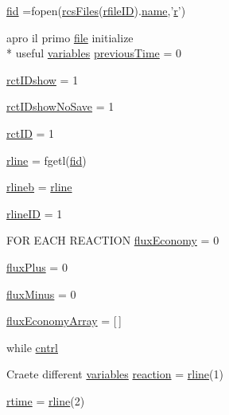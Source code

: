 \begin{DoxyCompactItemize}
\item 
\hyperlink{a00028_ae9011d40c6f13e68e6f07156e0da7c5d}{fid} =fopen(\hyperlink{a00028_aa7a414dad4901fc05688608a49adfd7e}{rcs\-Files}(\hyperlink{a00028_a2773ef160060ce8adead229154219112}{rfile\-I\-D}).\hyperlink{a00027_abbf559a76fab59203496b0847ab9502a}{name},'\hyperlink{a00031_ac862e7284527eb913b1351c8bfb8e079}{r}')
\item 
apro il primo \hyperlink{a00068_a4e8353d6c62cf54bf4a1a8f63e56b8c3}{file} initialize \\*
useful \hyperlink{a00037_a075795b83d470ba58980e465541f16e9}{variables} \hyperlink{a00028_a17b8652a085b5add031a40fb1c9a680e}{previous\-Time} = 0
\item 
\hyperlink{a00028_acfa9ac92c0e448faa531767d0e6ab194}{rct\-I\-Dshow} = 1
\item 
\hyperlink{a00028_aeb449dcc9eb8bfe0321b031e10962ac5}{rct\-I\-Dshow\-No\-Save} = 1
\item 
\hyperlink{a00028_acdd7317ca799b220a16028dcd54617a1}{rct\-I\-D} = 1
\item 
\hyperlink{a00028_a81318310a01613185f6a3e6183230bd0}{rline} = fgetl(\hyperlink{a00031_ae9011d40c6f13e68e6f07156e0da7c5d}{fid})
\item 
\hyperlink{a00028_a8df79027fd85d4a3668754f36e9e88c1}{rlineb} = \hyperlink{a00028_ab5b947e1a8b7cf496ffd4eb21317052e}{rline}
\item 
\hyperlink{a00028_a8443a49765859a8631fed7e8a1d27fe5}{rline\-I\-D} = 1
\item 
F\-O\-R E\-A\-C\-H R\-E\-A\-C\-T\-I\-O\-N \hyperlink{a00028_a8acf89849d5ed6a553d46d0e413773c5}{flux\-Economy} = 0
\item 
\hyperlink{a00028_a8fc578e8d997ae0f0e3063de3566646d}{flux\-Plus} = 0
\item 
\hyperlink{a00028_a3fea311ae703b9842f1429a370657f90}{flux\-Minus} = 0
\item 
\hyperlink{a00028_a5d3cba9db002e77eaf6ffce66592841f}{flux\-Economy\-Array} = \mbox{[}$\,$\mbox{]}
\item 
while \hyperlink{a00028_aae7c98255a05b6029bdfc5e96dc2ab88}{cntrl}
\item 
Craete different \hyperlink{a00037_a075795b83d470ba58980e465541f16e9}{variables} \hyperlink{a00028_a4ba2ecb46f808729569ecce2cc1d34c6}{reaction} = \hyperlink{a00028_ab5b947e1a8b7cf496ffd4eb21317052e}{rline}(1)
\item 
\hyperlink{a00028_afc6b38657a313b9f1de2ee356910b6ee}{rtime} = \hyperlink{a00028_ab5b947e1a8b7cf496ffd4eb21317052e}{rline}(2)
\item 

\end{DoxyCompactItemize}
